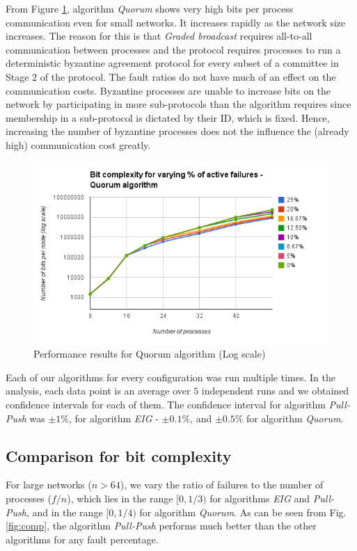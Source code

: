 From Figure \ref{fig:quorum}, algorithm \textit{Quorum} shows very high bits
per process communication even for small networks. It increases rapidly as the
network size increases. The reason for this is that \textit{Graded broadcast}
requires all-to-all communication between processes and the protocol requires
processes to run a deterministic byzantine agreement protocol for every subset
of a committee in Stage $2$ of the protocol. The fault ratios do not have much
of an effect on the communication costs. Byzantine processes are unable to
increase bits on the network by participating in more sub-protocols than the
algorithm requires since membership in a sub-protocol is dictated by their ID,
which is fixed. Hence, increasing the number of byzantine processes does not
the influence the (already high) communication cost greatly.
\begin{figure}[ht] \centering \includegraphics[scale=0.4]{quorum}
     \caption{Performance results for Quorum algorithm (Log
    scale)} \label{fig:quorum}  \end{figure}

Each of our algorithms for every configuration was run multiple times. In the
analysis, each data point is an average over $5$ independent runs and we
obtained confidence intervals for each of them. The confidence interval for
algorithm \textit{Pull-Push} was $\pm 1\%$, for algorithm \textit{EIG} - $\pm
0.1\%$, and $\pm 0.5\%$ for algorithm \textit{Quorum}.

\subsection{Comparison for bit complexity} For large networks ($n > 64$), we
vary the ratio of failures to the number of processes ($f/n$), which lies in
the range $[0, 1/3)$ for algorithms \textit{EIG} and \textit{Pull-Push}, and in
    the range $[0, 1/4)$ for algorithm \textit{Quorum}.  As can be seen from
        Fig. \ref{fig:comp}, the algorithm \textit{Pull-Push} performs much
        better than the other algorithms for any fault percentage.

